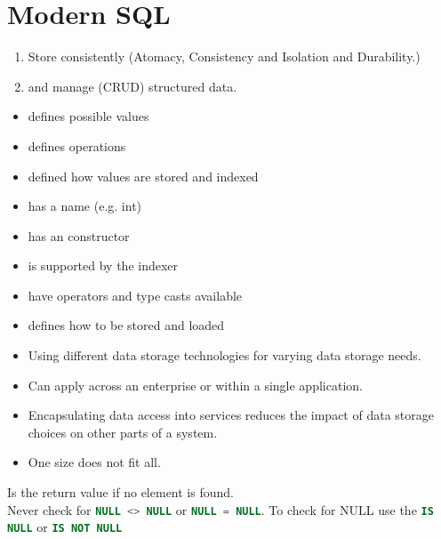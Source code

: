 \section{Modern SQL}
\begin{breakbox}
\begin{enumerate}
	\item Store consistently (\textcolor{Emerald}{A}tomacy, \textcolor{Emerald}{C}onsistency and \textcolor{Emerald}{I}solation and \textcolor{Emerald}{D}urability.)
	\item and manage (CRUD) structured data.
\end{enumerate}
\end{breakbox}

\begin{breakbox}
	\begin{itemize}
		\item defines possible values
		\item defines operations
		\item defined how values are stored and indexed
		\item has a name (e.g. int)
		\item has an constructor
		\item is supported by the indexer
		\item have operators and type casts available
		\item defines how to be stored and loaded
	\end{itemize}
\end{breakbox}

\begin{breakbox}
	\begin{itemize}
		\item Using different data storage technologies for varying data storage needs.
		\item Can apply across an enterprise or within a single application.
		\item Encapsulating data access into services reduces the impact of data storage choices on other parts of a system.
		\item One size does not fit all.
	\end{itemize}
\end{breakbox}

\begin{breakbox}
	\begin{breakbox}
		Is the return value if no element is found.\\
		Never check for
		\lstinline[language=sql]{NULL <> NULL} or
		\lstinline[language=sql]{NULL = NULL}.
		To check for NULL use the \lstinline[language=sql]{IS NULL} or
		\lstinline[language=sql]{IS NOT NULL}
	\end{breakbox}
	
\end{breakbox}
